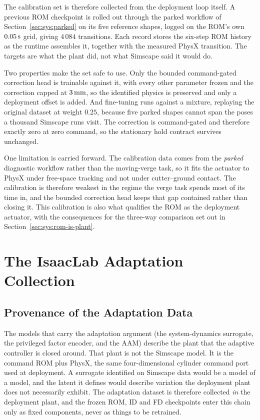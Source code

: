 The calibration set is therefore collected from the deployment loop itself. A
previous ROM checkpoint is rolled out through the parked workflow of
Section~\ref{sec:sys:parked} on its five reference shapes, logged on the ROM's
own $\unit[0.05]{s}$ grid, giving $4\,084$ transitions. Each record stores the
six-step ROM history as the runtime assembles it, together with the measured
PhysX transition. The targets are what the plant did, not what Simscape said it
would do.

Two properties make the set safe to use. Only the bounded command-gated
correction head is trainable against it, with every other parameter frozen and
the correction capped at $\unit[3]{mm}$, so the identified physics is preserved
and only a deployment offset is added. And fine-tuning runs against a mixture,
replaying the original dataset at weight $0.25$, because five parked shapes
cannot span the poses a thousand Simscape runs visit. The correction is
command-gated and therefore exactly zero at zero command, so the stationary
hold contract survives unchanged.

One limitation is carried forward. The calibration data comes from the
\emph{parked} diagnostic workflow rather than the moving-verge task, so it
fits the actuator to PhysX under free-space tracking and not under
cutter--ground contact. The calibration is therefore weakest in the regime the
verge task spends most of its time in, and the bounded correction head keeps
that gap contained rather than closing it. This calibration is also what
qualifies the ROM as the deployment actuator, with the consequences for the
three-way comparison set out in Section~\ref{sec:sys:rom-is-plant}.

\section{The IsaacLab Adaptation Collection}
\label{sec:data:isaaclab}

\subsection{Provenance of the Adaptation Data}

The models that carry the adaptation argument
(the system-dynamics surrogate, the privileged factor encoder, and the
AAM) describe the plant that the adaptive controller is closed around. That
plant is not the Simscape model. It is the command ROM plus PhysX, the
same four-dimensional cylinder command port used at deployment. A
surrogate identified on Simscape data would be a model of a model, and
the latent it defines would describe variation the deployment plant does
not necessarily exhibit. The adaptation dataset is therefore collected
\emph{in} the deployment plant, and the frozen ROM, ID and FD
checkpoints enter this chain only as fixed components, never as things
to be retrained.

